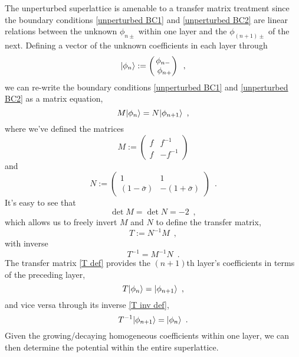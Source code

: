 \documentclass[submission, Phys]{SciPost}
\newcommand{\bpm}{\begin{pmatrix}}
\newcommand{\epm}{\end{pmatrix}}
\DeclarePairedDelimiter\ket{\lvert}{\rangle}
\begin{document}
The unperturbed superlattice is amenable to a transfer matrix treatment since the boundary conditions \eqref{unperturbed BC1} and \eqref{unperturbed BC2} are linear relations between the unknown $\phi_{n\pm}$ within one layer and the $\phi_{(n+1)\pm}$ of the next.  Defining a vector of the unknown coefficients in each layer through
\begin{equation}
    \label{phi vec def}
    \ket{\phi_n}:=\bpm
    \phi_{n-}
    \\\
    \phi_{n+}
    \epm
    \,\,\,,
\end{equation}
we can re-write the boundary conditions \eqref{unperturbed BC1} and \eqref{unperturbed BC2} as a matrix equation,
\begin{equation}
    \label{matrix BC}
    M\ket{\phi_n}= N\ket{\phi_{n+1}}
    \,\,\,,
\end{equation}
where we've defined the matrices
\begin{equation}
    \label{M def}
    M:=\bpm
    f & f^{-1}
    \\
    f & -f^{-1}
    \epm
\end{equation}
and
\begin{equation}
    \label{N def}
    N:=
    \bpm
    1 & 1
    \\
    (1-\bar\sigma) & -(1+\bar \sigma)
    \epm
    \,\,\,.
\end{equation}
It's easy to see that 
\begin{equation}
    \label{M and N det}
    \det M = \det N = -2
    \,\,\,,
\end{equation}
which allows us to freely invert $M$ and $N$ to define the transfer matrix,
\begin{equation}
    \label{T def}
    T:= N^{-1} M
    \,\,\,,
\end{equation}
with inverse
\begin{equation}
    \label{T inv def}
    T^{-1} = M^{-1} N
    \,\,\,.
\end{equation}
The transfer matrix \eqref{T def} provides the $(n+1)$th layer's coefficients in terms of the preceding layer,
\begin{equation}
    \label{T action}
    T\ket{\phi_n} = \ket{\phi_{n+1}}
    \,\,\,,
\end{equation}
and vice versa through its inverse \eqref{T inv def},
\begin{equation}
    \label{T inv action}
    T^{-1}\ket{\phi_{n+1}} = \ket{\phi_n}
    \,\,\,.
\end{equation}
Given the growing/decaying homogeneous coefficients within one layer, we can then determine the potential within the entire superlattice.
\end{document}
